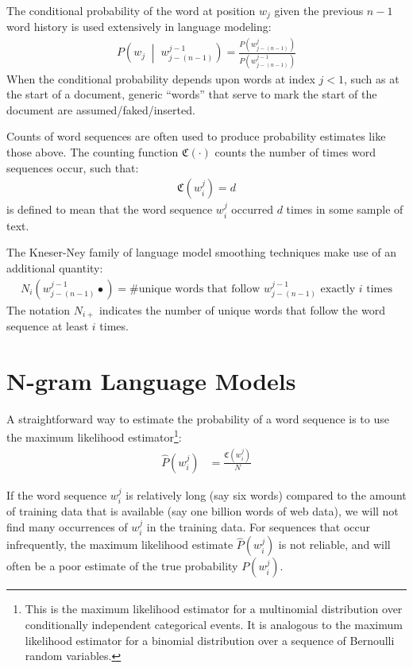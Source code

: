 \documentclass[10pt]{article}
\newcommand{\BNgram}{$\mathbf{N}$-gram\xspace}
\newcommand{\cnt}[1]{\mathfrak{C}\left(#1\right)}
\newcommand{\prb}[1]{P\left(#1\right)}
\newcommand{\cprb}[2]{P\left(#1 \;\middle\vert\; #2 \right)}
\newcommand{\hprb}[1]{\widehat{P}\left(#1\right)}
\begin{document}
The conditional probability of the word at position $w_j$ given the previous $n-1$ word history is used extensively in language modeling:
\begin{align}
\cprb{w_j}{w^{j-1}_{j-(n-1)}} = \frac{ \prb{w^{j}_{j-(n-1)}} }{ \prb{w^{j-1}_{j-(n-1)}} }
\end{align}
When the conditional probability depends upon words at index $j < 1$, such as at the start of a document, generic ``words'' that serve to mark the start of the document are assumed/faked/inserted.

Counts of word sequences are often used to produce probability estimates like those above.
The counting function $\cnt{\cdot}$ counts the number of times word sequences occur, such that:
\begin{align}
\cnt{w_i^j} = d
\end{align}
is defined to mean that the word sequence $w_i^j$ occurred $d$ times in some sample of text.

The Kneser-Ney family of language model smoothing techniques make use of an additional quantity:
\begin{align}
N_i(w^{j-1}_{j-(n-1)}\bullet) = \text{\# unique words that follow $w^{j-1}_{j-(n-1)}$ exactly $i$ times} 
\end{align}
The notation $N_{i+}$ indicates the number of unique words that follow the word sequence at least $i$ times.


\section{\BNgram Language Models}
A straightforward way to estimate the probability of a word sequence is to use the maximum likelihood 
estimator\footnote{This is the maximum likelihood estimator for a multinomial distribution over conditionally independent categorical events.  It is analogous to the maximum likelihood estimator for a binomial distribution over a sequence of Bernoulli random variables.}:
\begin{align}
\hprb{w_i^j} &= \frac{\cnt{w_i^j}}{N} \label{equSeqFreq}
\end{align}

If the word sequence $w_i^j$ is relatively long (say six words) compared to the amount of training data that is available (say one billion words of web data), we will not find many occurrences of $w_i^j$ in the training data.
For sequences that occur infrequently, the maximum likelihood estimate $\hprb{w_i^j}$ is not reliable, and will often be a poor estimate of the true probability $\prb{w_i^j}$.
\end{document}

